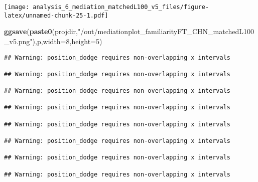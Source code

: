 \documentclass[
]{article}
\newenvironment{Shaded}{\begin{snugshade}}{\end{snugshade}}
\newcommand{\DataTypeTok}[1]{\textcolor[rgb]{0.13,0.29,0.53}{#1}}
\newcommand{\DecValTok}[1]{\textcolor[rgb]{0.00,0.00,0.81}{#1}}
\newcommand{\KeywordTok}[1]{\textcolor[rgb]{0.13,0.29,0.53}{\textbf{#1}}}
\newcommand{\NormalTok}[1]{#1}
\newcommand{\StringTok}[1]{\textcolor[rgb]{0.31,0.60,0.02}{#1}}
\begin{document}
\texttt{[image: analysis\_6\_mediation\_matchedL100\_v5\_files/figure-latex/unnamed-chunk-25-1.pdf]}

\begin{Shaded}
\begin{Highlighting}[]
\KeywordTok{ggsave}\NormalTok{(}\KeywordTok{paste0}\NormalTok{(projdir,}\StringTok{"/out/mediationplot_familiarityFT_CHN_matchedL100_v5.png"}\NormalTok{),p,}\DataTypeTok{width=}\DecValTok{8}\NormalTok{,}\DataTypeTok{height=}\DecValTok{5}\NormalTok{)}
\end{Highlighting}
\end{Shaded}

\begin{verbatim}
## Warning: position_dodge requires non-overlapping x intervals

## Warning: position_dodge requires non-overlapping x intervals

## Warning: position_dodge requires non-overlapping x intervals

## Warning: position_dodge requires non-overlapping x intervals

## Warning: position_dodge requires non-overlapping x intervals

## Warning: position_dodge requires non-overlapping x intervals

## Warning: position_dodge requires non-overlapping x intervals

## Warning: position_dodge requires non-overlapping x intervals
\end{verbatim}
\end{document}
